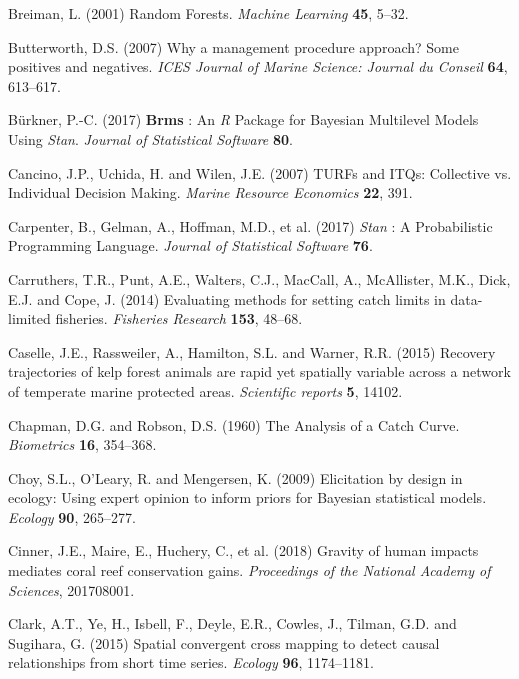 \documentclass[twoside,12pt,final]{ucthesis-CA2012}
\begin{document}
\begin{ucmainmatter}
\hypertarget{ref-Breiman2001}{}
Breiman, L. (2001) Random Forests. \emph{Machine Learning} \textbf{45},
5--32.

\hypertarget{ref-Butterworth2007}{}
Butterworth, D.S. (2007) Why a management procedure approach? Some
positives and negatives. \emph{ICES Journal of Marine Science: Journal
du Conseil} \textbf{64}, 613--617.

\hypertarget{ref-Burkner2017}{}
Bürkner, P.-C. (2017) \textbf{Brms} : An \emph{R} Package for Bayesian
Multilevel Models Using \emph{Stan}. \emph{Journal of Statistical
Software} \textbf{80}.

\hypertarget{ref-Cancino2007}{}
Cancino, J.P., Uchida, H. and Wilen, J.E. (2007) TURFs and ITQs:
Collective vs. Individual Decision Making. \emph{Marine Resource
Economics} \textbf{22}, 391.

\hypertarget{ref-Carpenter2017}{}
Carpenter, B., Gelman, A., Hoffman, M.D., et al. (2017) \emph{Stan} : A
Probabilistic Programming Language. \emph{Journal of Statistical
Software} \textbf{76}.

\hypertarget{ref-Carruthers2014}{}
Carruthers, T.R., Punt, A.E., Walters, C.J., MacCall, A., McAllister,
M.K., Dick, E.J. and Cope, J. (2014) Evaluating methods for setting
catch limits in data-limited fisheries. \emph{Fisheries Research}
\textbf{153}, 48--68.

\hypertarget{ref-Caselle2015}{}
Caselle, J.E., Rassweiler, A., Hamilton, S.L. and Warner, R.R. (2015)
Recovery trajectories of kelp forest animals are rapid yet spatially
variable across a network of temperate marine protected areas.
\emph{Scientific reports} \textbf{5}, 14102.

\hypertarget{ref-Chapman1960}{}
Chapman, D.G. and Robson, D.S. (1960) The Analysis of a Catch Curve.
\emph{Biometrics} \textbf{16}, 354--368.

\hypertarget{ref-Choy2009}{}
Choy, S.L., O'Leary, R. and Mengersen, K. (2009) Elicitation by design
in ecology: Using expert opinion to inform priors for Bayesian
statistical models. \emph{Ecology} \textbf{90}, 265--277.

\hypertarget{ref-Cinner2018}{}
Cinner, J.E., Maire, E., Huchery, C., et al. (2018) Gravity of human
impacts mediates coral reef conservation gains. \emph{Proceedings of the
National Academy of Sciences}, 201708001.

\hypertarget{ref-Clark2015}{}
Clark, A.T., Ye, H., Isbell, F., Deyle, E.R., Cowles, J., Tilman, G.D.
and Sugihara, G. (2015) Spatial convergent cross mapping to detect
causal relationships from short time series. \emph{Ecology} \textbf{96},
1174--1181.


\end{ucmainmatter}
\end{document}
